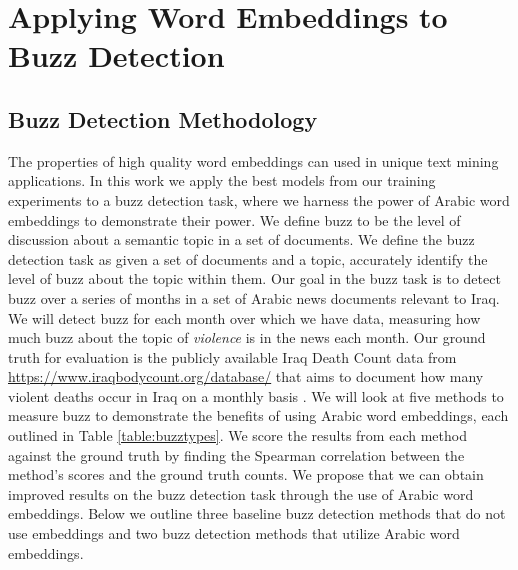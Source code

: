 \chapter{Applying Word Embeddings to Buzz Detection}
\label{sec:buzz}

\section{Buzz Detection Methodology}

The properties of high quality word embeddings can used in unique text mining applications. In this work we apply the best models from our training experiments to a buzz detection task, where we harness the power of Arabic word embeddings to demonstrate their power. We define buzz to be the level of discussion about a semantic topic in a set of documents. We define the buzz detection task as given a set of documents and a topic, accurately identify the level of buzz about the topic within them. Our goal in the buzz task is to detect buzz over a series of months in a set of Arabic news documents relevant to Iraq. We will detect buzz for each month over which we have data, measuring how much buzz about the topic of \textit{violence} is in the news each month. Our ground truth for evaluation is the publicly available Iraq Death Count data from \url{https://www.iraqbodycount.org/database/} that aims to document how many violent deaths occur in Iraq on a monthly basis \cite{IraqB68:online}. We will look at five methods to measure buzz to demonstrate the benefits of using Arabic word embeddings, each outlined in Table \ref{table:buzztypes}. We score the results from each method against the ground truth by finding the Spearman correlation between the method's scores and the ground truth counts. We propose that we can obtain improved results on the buzz detection task through the use of Arabic word embeddings. Below we outline three baseline buzz detection methods that do not use embeddings and two buzz detection methods that utilize Arabic word embeddings.

\\

